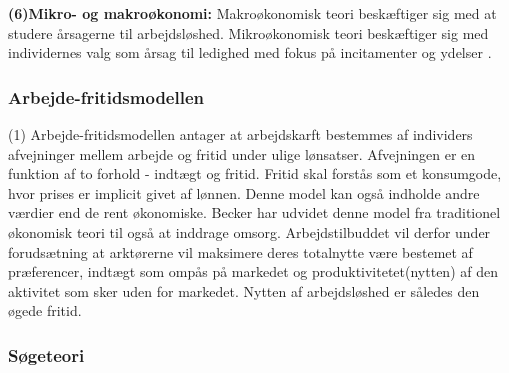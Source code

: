 \noindent \textbf{(6)Mikro- og makroøkonomi:} Makroøkonomisk teori beskæftiger sig med at studere årsagerne til arbejdsløshed. Mikroøkonomisk teori beskæftiger sig med individernes valg som årsag til ledighed med fokus på incitamenter og ydelser \parencite[25]{Halvorsen1999}.



\subsubsection{\textbf{Arbejde-fritidsmodellen} \parencite[27]{Halvorsen1999}}

(1) Arbejde-fritidsmodellen antager at arbejdskarft bestemmes af individers afvejninger mellem arbejde og fritid under ulige lønsatser. Afvejningen er en funktion af to forhold - indtægt og fritid. Fritid skal forstås som et konsumgode, hvor prises er implicit givet af lønnen. Denne model kan også indholde andre værdier end de rent økonomiske. Becker har udvidet denne model fra traditionel økonomisk teori til også at inddrage omsorg.  Arbejdstilbuddet vil derfor under forudsætning at arktørerne vil maksimere deres totalnytte være bestemet af præferencer, indtægt som ompås på markedet og produktivitetet(nytten) af den aktivitet som sker uden for markedet. Nytten af arbejdsløshed er således den øgede fritid. \parencite[27]{Halvorsen1999} \parencite[388-390]{Mankiw2011}


\subsubsection{\textbf{Søgeteori} \parencite[27-29]{Halvorsen1999}}


